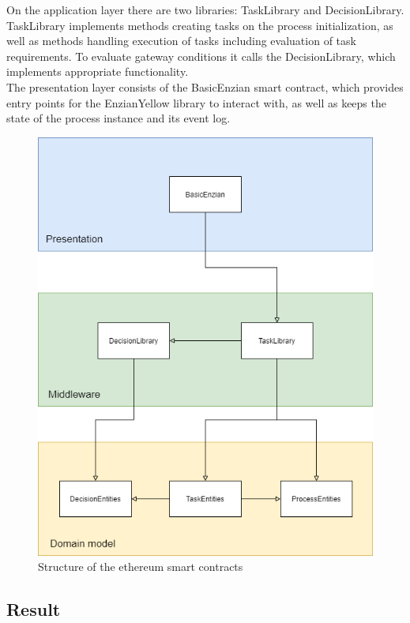 On the application layer there are two libraries: TaskLibrary and DecisionLibrary. TaskLibrary implements methods creating tasks on the process initialization, as well as methods handling execution of tasks including evaluation of task requirements. To evaluate gateway conditions it calls the DecisionLibrary, which implements appropriate functionality.\\

The presentation layer consists of the BasicEnzian smart contract, which provides entry points for the EnzianYellow library to interact with, as well as keeps the state of the process instance and its event log. 

\begin{figure}[hbt]
	\includegraphics[width=\textwidth]{gfx/eth-contracts}
	\caption{Structure of the ethereum smart contracts}
	\label{fig:impr:eth:contracts}
\end{figure}

\subsection{Result}
\label{sec:impr:eth:result}

